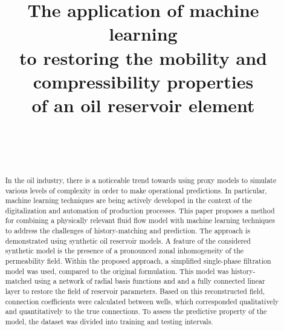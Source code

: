 \documentclass[
11pt,%
tightenlines,%
twoside,%
onecolumn,%
nofloats,%
nobibnotes,%
nofootinbib,%
superscriptaddress,%
noshowpacs,%
centertags]%
{revtex4}
\begin{document}

\title{The application of machine learning \\ to restoring the mobility and compressibility properties \\ of an oil reservoir element}

\author{~}


\author{~}




\begin{abstract} %
In the oil industry, there is a noticeable trend towards using proxy models to simulate various levels of complexity in order to make operational predictions. In particular, machine learning techniques are being actively developed in the context of the digitalization and automation of production processes.
This paper proposes a method for combining a physically relevant fluid flow model with machine learning techniques to address the challenges of history-matching and prediction. The approach is demonstrated using synthetic oil reservoir models.
A feature of the considered synthetic model is the presence of a pronounced zonal inhomogeneity of the permeability field. 
Within the proposed approach, a simplified single-phase filtration model was used, compared to the original formulation. This model was history-matched using a network of radial basis functions and  and a fully connected linear layer to restore the field of reservoir parameters. Based on this reconstructed field, connection coefficients were calculated between wells, which corresponded qualitatively and quantitatively to the true connections. To assess the predictive property of the model, the dataset was divided into training and testing intervals.
\end{abstract}
\end{document}
